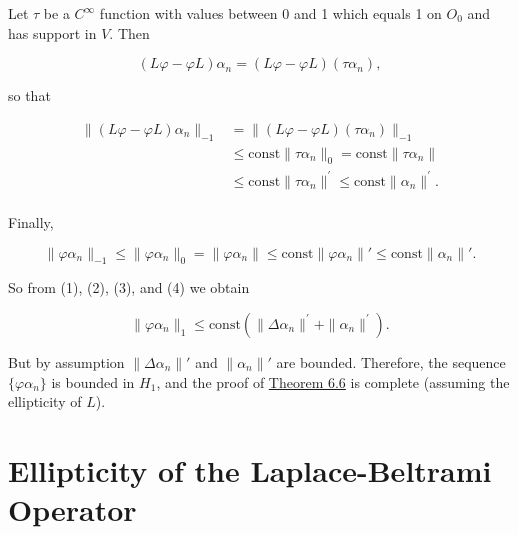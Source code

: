 Let  $ \tau $ be a  $ C^{\infty} $ function with values between 0 and 1 which equals 1 on $O_{0}$ and has support in $V$. Then

\[
(L\varphi-\varphi L)\alpha_{n}=(L\varphi-\varphi L)(\tau\alpha_{n}),
\]

so that

\begin{equation}
\tag{3}\label{eq:6.33:3}
\begin{aligned}{\|(L\varphi-\varphi L)\alpha_{n}\|_{-1}}&{{}=\|(L\varphi-\varphi L)(\tau\alpha_{n})\|_{-1}}\\ {}&{{}\leq\mathrm{const}\|\tau\alpha_{n}\|_{0}=\mathrm{const}\|\tau\alpha_{n}\|}\\ {}&{{}\leq\mathrm{const}\|\tau\alpha_{n}\|^{\prime}\leq\mathrm{const}\|\alpha_{n}\|^{\prime}.}\\ \end{aligned}
\end{equation}

Finally,

\begin{equation}
\tag{4}\label{eq:6.33:4}
\|\varphi\alpha_{n}\|_{-1}\leq\|\varphi\alpha_{n}\|_{0}=\|\varphi\alpha_{n}\|\leq\mathrm{const}\|\varphi\alpha_{n}\|'\leq\mathrm{const}\|\alpha_{n}\|'.
\end{equation}

So from (1), (2), (3), and (4) we obtain

\begin{equation}
\tag{5}\label{eq:6.33:5}
\|\varphi\alpha_{n}\|_{1}\leq\mathrm{const}\left(\|\Delta\alpha_{n}\|^{\prime}+\|\alpha_{n}\|^{\prime}\right).
\end{equation}

But by assumption $\|\Delta\alpha_n\|'$ and $\|\alpha_n\|'$ are bounded. Therefore, the sequence $\{\varphi\alpha_n\}$ is bounded in $H_1$, and the proof of \hyperref[thm:6.6]{Theorem 6.6} is complete (assuming the ellipticity of $L$).

\section{Ellipticity of the Laplace-Beltrami Operator}


